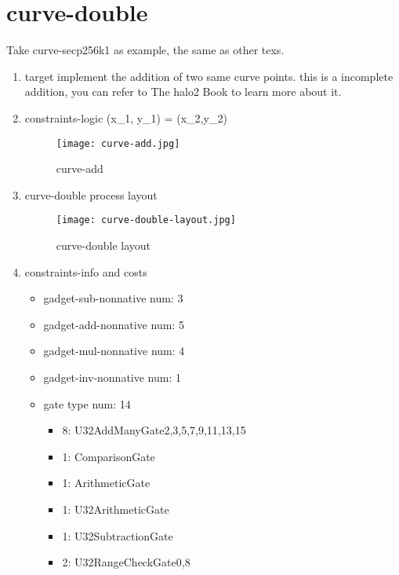 \section{curve-double}
\label{curve-double}

Take curve-secp256k1 as example, the same as other texs.

\begin{enumerate}
    \item target
        implement the addition of two same curve points. this is a incomplete addition, you can refer to The halo2 Book \cite{website:halo2-book} to learn more about it.
    \item constraints-logic (x\_1, y\_1) = (x\_2,y\_2)
        \begin{figure}[!ht]
            \centering
            \texttt{[image: curve-add.jpg]}
            \caption{curve-add}
            \label{fig:curve-add}
        \end{figure}
    \item curve-double process layout
        \begin{figure}[!ht]
            \centering
            \texttt{[image: curve-double-layout.jpg]}
            \caption{curve-double layout}
            \label{fig:curve-double-layout}
        \end{figure}
    
    \item constraints-info and costs
        \begin{itemize}
            \item gadget-sub-nonnative num: 3
            \item gadget-add-nonnative num: 5
            \item gadget-mul-nonnative num: 4
            \item gadget-inv-nonnative num: 1
            \item gate type num: 14
                \begin{itemize}
                    \item 8: U32AddManyGate{2,3,5,7,9,11,13,15}
                    \item 1: ComparisonGate
                    \item 1: ArithmeticGate
                    \item 1: U32ArithmeticGate
                    \item 1: U32SubtractionGate
                    \item 2: U32RangeCheckGate{0,8}
                \end{itemize}
        \end{itemize}

\end{enumerate}